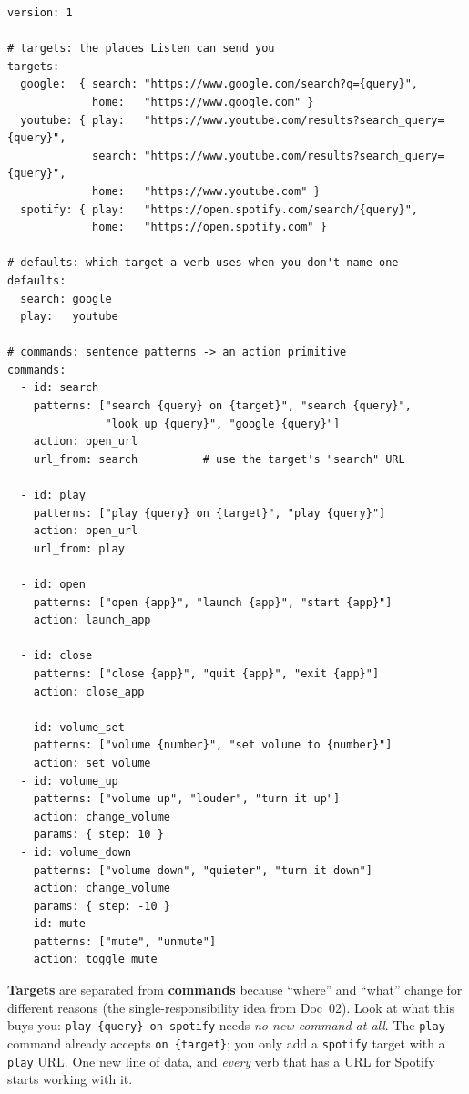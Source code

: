 \documentclass[11pt,a4paper]{article}
\begin{document}
\begin{lstlisting}
version: 1

# targets: the places Listen can send you
targets:
  google:  { search: "https://www.google.com/search?q={query}",
             home:   "https://www.google.com" }
  youtube: { play:   "https://www.youtube.com/results?search_query={query}",
             search: "https://www.youtube.com/results?search_query={query}",
             home:   "https://www.youtube.com" }
  spotify: { play:   "https://open.spotify.com/search/{query}",
             home:   "https://open.spotify.com" }

# defaults: which target a verb uses when you don't name one
defaults:
  search: google
  play:   youtube

# commands: sentence patterns -> an action primitive
commands:
  - id: search
    patterns: ["search {query} on {target}", "search {query}",
               "look up {query}", "google {query}"]
    action: open_url
    url_from: search          # use the target's "search" URL

  - id: play
    patterns: ["play {query} on {target}", "play {query}"]
    action: open_url
    url_from: play

  - id: open
    patterns: ["open {app}", "launch {app}", "start {app}"]
    action: launch_app

  - id: close
    patterns: ["close {app}", "quit {app}", "exit {app}"]
    action: close_app

  - id: volume_set
    patterns: ["volume {number}", "set volume to {number}"]
    action: set_volume
  - id: volume_up
    patterns: ["volume up", "louder", "turn it up"]
    action: change_volume
    params: { step: 10 }
  - id: volume_down
    patterns: ["volume down", "quieter", "turn it down"]
    action: change_volume
    params: { step: -10 }
  - id: mute
    patterns: ["mute", "unmute"]
    action: toggle_mute
\end{lstlisting}

\begin{why}
\textbf{Targets} are separated from \textbf{commands} because ``where'' and ``what'' change for
different reasons (the single-responsibility idea from Doc~02). Look at what this buys you:
\texttt{play \{query\} on spotify} needs \emph{no new command at all}. The \texttt{play} command
already accepts \texttt{on \{target\}}; you only add a \texttt{spotify} target with a
\texttt{play} URL. One new line of data, and \emph{every} verb that has a URL for Spotify
starts working with it.
\end{why}
\end{document}

